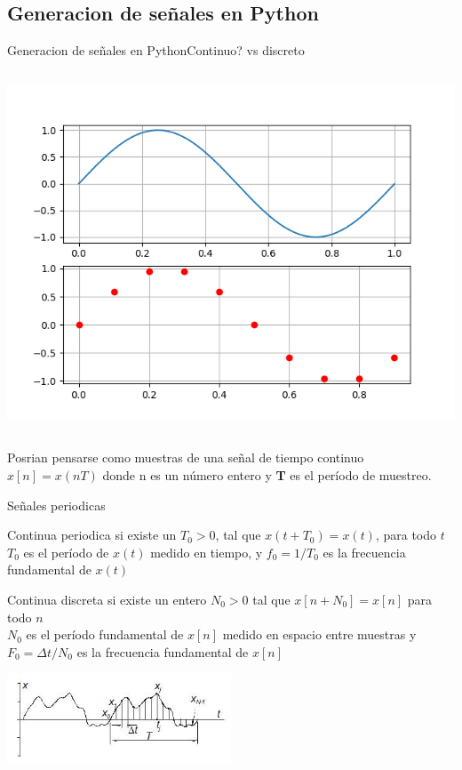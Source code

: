\documentclass{beamer}
\begin{document}
\begin{darkframes}
    \subsection{Generacion de señales en Python}
    \begin{frame}{Generacion de señales en Python}{Continuo? vs discreto}
      \begin{columns}[onlytextwidth]
      
      \includegraphics[width=\textwidth]{1_clase/python_continuo_vs_discreto}
         \end{columns}
         Posrian pensarse como muestras de una señal de tiempo continuo $x[n] = x (nT)$ donde n es un número entero y \textbf{T} es el período de muestreo.
      \vfill
    \end{frame}
    \begin{frame}{Señales periodicas}
      \begin{block}{Continua periodica}
         si existe un $T_0>0$, tal que $x(t+T_0)=x(t)$, para todo $t$\\
         $T_0$ es el período de $x(t)$ medido en tiempo, y $f_0=1/T_0$ es la frecuencia fundamental de $x(t)$
   \end{block}
      \begin{block}{Continua discreta}
         si existe un entero $N_0>0$ tal que $x[n+N_0]=x[n]$ para
         todo $n$ \\
         $N_0$ es el período fundamental de $x[n]$ medido en espacio entre muestras
         y  $F_0=\Delta t/N_0$ es la frecuencia fundamental de $x[n]$
   \end{block}
      \center\includegraphics[width=0.5\textwidth]{1_clase/periodica}
   \vfill
   \end{frame}

\end{darkframes}
\end{document}
